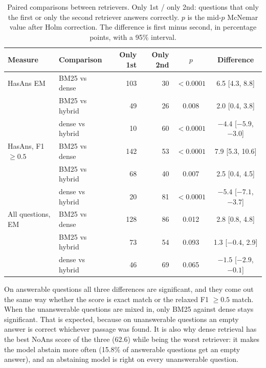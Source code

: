 \begin{table}[H]
	\centering
	\caption{Paired comparisons between retrievers. Only 1st / only 2nd: questions that only the first or only the second retriever answers correctly. $p$ is the mid-$p$ McNemar value after Holm correction. The difference is first minus second, in percentage points, with a 95\% interval.}
	\label{tab:pairs}
	\small
	\begin{tabular}{llrrcc}
		\toprule
		Measure & Comparison & Only 1st & Only 2nd & $p$ & Difference \\
		\midrule
		HasAns EM & BM25 vs dense & 103 & 30 & $<0.0001$ & 6.5 [4.3, 8.8] \\
		 & BM25 vs hybrid & 49 & 26 & 0.008 & 2.0 [0.4, 3.8] \\
		 & dense vs hybrid & 10 & 60 & $<0.0001$ & $-4.4$ [$-5.9$, $-3.0$] \\
		\midrule
		HasAns, F1 $\ge 0.5$ & BM25 vs dense & 142 & 53 & $<0.0001$ & 7.9 [5.3, 10.6] \\
		 & BM25 vs hybrid & 68 & 40 & 0.007 & 2.5 [0.4, 4.5] \\
		 & dense vs hybrid & 20 & 81 & $<0.0001$ & $-5.4$ [$-7.1$, $-3.7$] \\
		\midrule
		All questions, EM & BM25 vs dense & 128 & 86 & 0.012 & 2.8 [0.8, 4.8] \\
		 & BM25 vs hybrid & 73 & 54 & 0.093 & 1.3 [$-0.4$, 2.9] \\
		 & dense vs hybrid & 46 & 69 & 0.065 & $-1.5$ [$-2.9$, $-0.1$] \\
		\bottomrule
	\end{tabular}
\end{table}

On answerable questions all three differences are significant, and they come out the same way whether the score is exact match or the relaxed F1 $\ge 0.5$ match. When the unanswerable questions are mixed in, only BM25 against dense stays significant. That is expected, because on unanswerable questions an empty answer is correct whichever passage was found. It is also why dense retrieval has the best NoAns score of the three (62.6) while being the worst retriever: it makes the model abstain more often (15.8\% of answerable questions get an empty answer), and an abstaining model is right on every unanswerable question.

